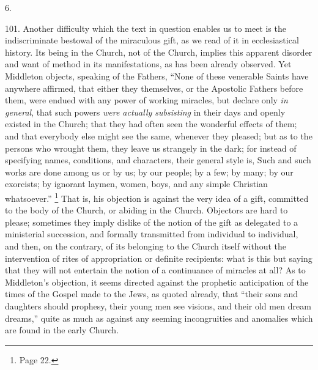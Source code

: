 6.

101.
Another difficulty which the text in question enables us to meet is
the indiscriminate bestowal of the miraculous gift, as we read of it
in ecclesiastical history. Its being in the Church, not of the Church,
implies this apparent disorder and want of method in its
manifestations, as has been already observed. Yet Middleton objects,
speaking of the Fathers, ``None of these venerable Saints have anywhere
affirmed, that either they themselves, or the Apostolic Fathers before
them, were endued with any power of working miracles, but declare only
\emph{in general}, that such powers \emph{were actually subsisting} in
their days and openly existed in the Church; that they had often seen
the wonderful effects of them; and that everybody else might see the
same, whenever they pleased; but as to the persons who wrought them,
they leave us strangely in the dark; for instead of specifying names, conditions,
and characters, their general style is, Such and such works are done
among us or by us; by our people; by a few; by many; by our exorcists;
by ignorant laymen, women, boys, and any simple Christian whatsoever.''
\footnote{Page 22.} That is, his objection
is against the very idea of a gift, committed to the body of the
Church, or abiding in the Church. Objectors are hard to please;
sometimes they imply dislike of the notion of the gift as delegated to
a ministerial succession, and formally transmitted from individual to
individual, and then, on the contrary, of its belonging to the Church
itself without the intervention of rites of appropriation or definite
recipients: what is this but saying that they will not entertain the
notion of a continuance of miracles at all? As to Middleton's
objection, it seems directed against the prophetic anticipation of the
times of the Gospel made to the Jews, as quoted already, that ``their
sons and daughters should prophesy, their young men see visions, and
their old men dream dreams,'' quite as much as against any seeming
incongruities and anomalies which are found in the early Church.


